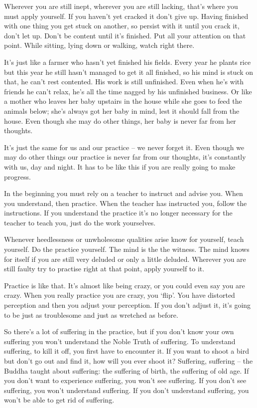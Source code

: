 Wherever you are still inept, wherever you are still lacking, that's where you must apply yourself. If you haven't yet cracked it don't give up. Having finished with one thing you get stuck on another, so persist with it until you crack it, don't let up. Don't be content until it's finished. Put all your attention on that point. While sitting, lying down or walking, watch right there. 

It's just like a farmer who hasn't yet finished his fields. Every year he plants rice but this year he still hasn't managed to get it all finished, so his mind is stuck on that, he can't rest contented. His work is still unfinished. Even when he's with friends he can't relax, he's all the time nagged by his unfinished business. Or like a mother who leaves her baby upstairs in the house while she goes to feed the animals below; she's always got her baby in mind, lest it should fall from the house. Even though she may do other things, her baby is never far from her thoughts. 

It's just the same for us and our practice -- we never forget it. Even though we may do other things our practice is never far from our thoughts, it's constantly with us, day and night. It has to be like this if you are really going to make progress. 

In the beginning you must rely on a teacher to instruct and advise you. When you understand, then practice. When the teacher has instructed you, follow the instructions. If you understand the practice it's no longer necessary for the teacher to teach you, just do the work yourselves.

Whenever heedlessness or unwholesome qualities arise know for yourself, teach yourself. Do the practice yourself. The mind is the  the witness. The mind knows for itself if you are still very deluded or only a little deluded. Wherever you are still faulty try to practise right at that point, apply yourself to it. 

Practice is like that. It's almost like being crazy, or you could even say you are crazy. When you really practice you are crazy, you `flip'. You have distorted perception and then you adjust your perception. If you don't adjust it, it's going to be just as troublesome and just as wretched as before. 

So there's a lot of suffering in the practice, but if you don't know your own suffering you won't understand the Noble Truth of suffering. To understand suffering, to kill it off, you first have to encounter it. If you want to shoot a bird but don't go out and find it, how will you ever shoot it? Suffering, suffering -- the Buddha taught about suffering: the suffering of birth, the suffering of old age. If you don't want to experience suffering, you won't see suffering. If you don't see suffering, you won't understand suffering. If you don't understand suffering, you won't be able to get rid of suffering. 

